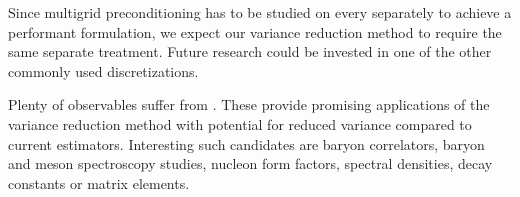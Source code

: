 Since multigrid preconditioning has to be studied on every  separately to achieve a performant formulation, we expect our variance reduction method to require the same separate treatment.
Future research could be invested in one of the other commonly used discretizations.

Plenty of observables suffer from .
These provide promising applications of the variance reduction method with potential for reduced variance compared to current estimators.
Interesting such candidates are baryon correlators, baryon and meson spectroscopy studies, nucleon form factors, spectral densities, decay constants or matrix elements.






